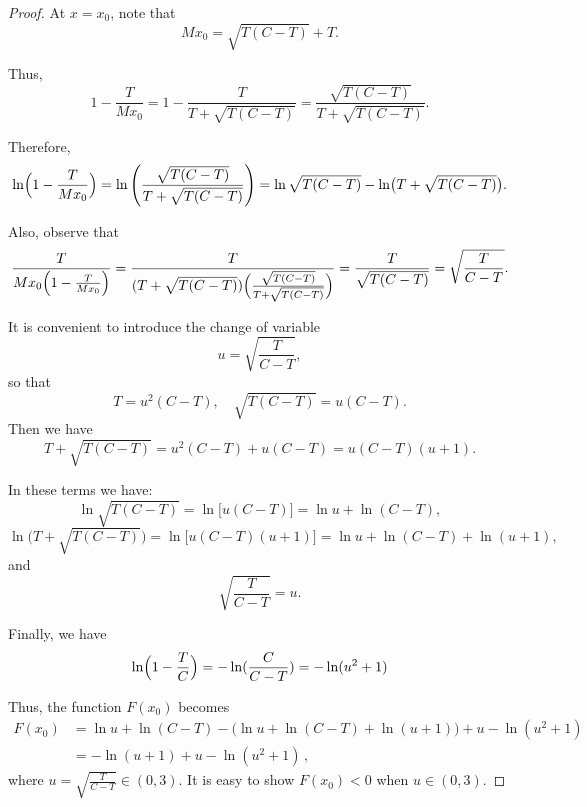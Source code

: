 \begin{proof}
    At \( x = x_0 \), note that
\[
Mx_0 = \sqrt{T(C-T)} + T.
\]

Thus,
\[
1 - \frac{T}{Mx_0} 
= 1 - \frac{T}{T+\sqrt{T(C-T)}}
= \frac{\sqrt{T(C-T)}}{T+\sqrt{T(C-T)}}.
\]

Therefore,
\[
\ln\Bigl(1-\frac{T}{Mx_0}\Bigr)
=\ln\left(\frac{\sqrt{T(C-T)}}{T+\sqrt{T(C-T)}}\right)
=\ln\sqrt{T(C-T)} - \ln\bigl(T+\sqrt{T(C-T)}\bigr).
\]

Also, observe that
\[
\frac{T}{Mx_0\Bigl(1-\frac{T}{Mx_0}\Bigr)}
=\frac{T}{(T+\sqrt{T(C-T)})\Bigl(\frac{\sqrt{T(C-T)}}{T+\sqrt{T(C-T)}}\Bigr)}
=\frac{T}{\sqrt{T(C-T)}}
=\sqrt{\frac{T}{C-T}}.
\]

It is convenient to introduce the change of variable
\[
u = \sqrt{\frac{T}{C-T}},
\]
so that
\[
T = u^2 (C-T),\quad \sqrt{T(C-T)} = u(C-T). 
\]
Then we have
$$T+\sqrt{T(C-T)} = u^2 (C-T) + u(C-T) = u(C-T)(u+1).$$


In these terms we have:
\[
\ln\sqrt{T(C-T)} = \ln\bigl[u(C-T)\bigr] = \ln u + \ln(C-T),
\]
\[
\ln\bigl(T+\sqrt{T(C-T)}\bigr) = \ln\bigl[u(C-T)(u+1)\bigr] = \ln u + \ln(C-T) + \ln(u+1),
\]
and
\[
\sqrt{\frac{T}{C-T}} = u.
\]

Finally, we have
\[
\ln\Bigl(1-\frac{T}{C}\Bigr) = -\ln(\frac{C}{C-T}) = -\ln(u^2 +1)
\]

Thus, the function \( F(x_0) \) becomes
\begin{align}
F(x_0)
&=\ln u + \ln(C-T) - \bigl(\ln u + \ln(C-T) + \ln(u+1)\bigr) + u -\ln (u^2+1)\\
&= -\ln(u+1) + u - \ln(u^2 +1)\, ,
\end{align}
where $u = \sqrt{\frac{T}{C-T}} \in \left(0,3\right).$
It is easy to show $F(x_0)<0$ when $u \in \left(0,3\right)$.
\end{proof}